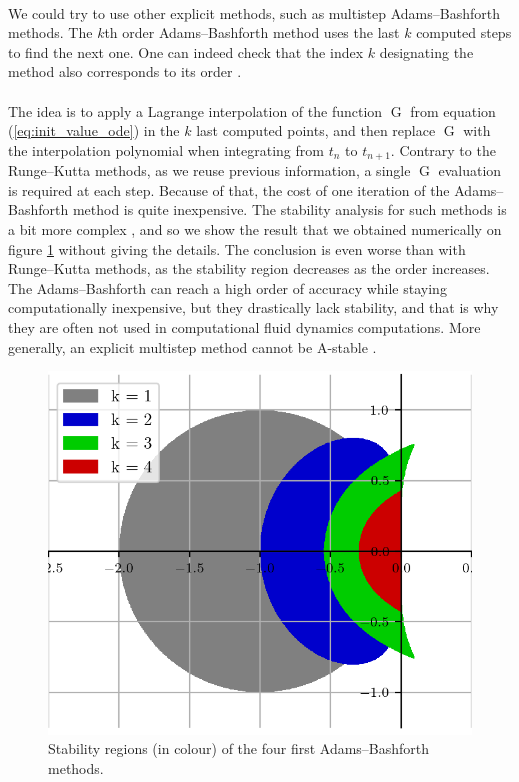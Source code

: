         \paragraph{}
        We could try to use other explicit methods, such as multistep Adams--Bashforth methods.
        The $k$th order Adams--Bashforth method uses the last $k$ computed steps to find the next one.
        One can indeed check that the index $k$ designating the method also corresponds to its order \cite{HairerNorsettWanner1993}.

        \paragraph{}
        The idea is to apply a Lagrange interpolation of the function $\operatorname{G}$ from equation (\ref{eq:init_value_ode}) in the $k$ last computed points, and then replace $\operatorname{G}$ with the interpolation polynomial when integrating from $t_n$ to $t_{n+1}$.
        Contrary to the Runge--Kutta methods, as we reuse previous information, a single $\operatorname{G}$ evaluation is required at each step.
        Because of that, the cost of one iteration of the Adams--Bashforth method is quite inexpensive.
        The stability analysis for such methods is a bit more complex \cite{HairerNorsettWanner1993, HairerWanner1996}, and so we show the result that we obtained numerically on figure \ref{fig:ab_stab} without giving the details.
        The conclusion is even worse than with Runge--Kutta methods, as the stability region decreases as the order increases.
        The Adams--Bashforth can reach a high order of accuracy while staying computationally inexpensive, but they drastically lack stability, and that is why they are often not used in computational fluid dynamics computations.
        More generally, an explicit multistep method cannot be A-stable \cite{Dahlquist1963}.

        \begin{figure}
          \centering
          \includegraphics{figures/ab_stab.png}
          \caption{Stability regions (in colour) of the four first Adams--Bashforth methods.}
          \label{fig:ab_stab}
        \end{figure}



